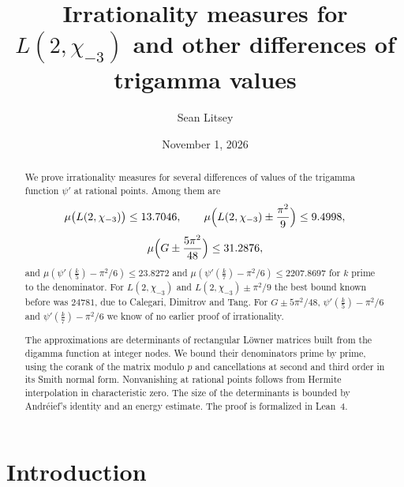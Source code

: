 \documentclass[11pt]{amsart}
\theoremstyle{definition}
\theoremstyle{remark}
\numberwithin{equation}{section}
\newcommand{\MuLamU}{31.2876}
\newcommand{\MuThirdsU}{9.4998}
\newcommand{\MuFifthsU}{23.8272}
\newcommand{\MuSeventhsU}{2207.8697}
\newcommand{\MuChi}{13.7046}
\begin{document}
\title[Irrationality measures for $L(2,\chi_{-3})$ and other trigamma differences]{Irrationality measures for
$L(2,\chi_{-3})$ and other differences of trigamma values}

\author{Sean Litsey}

\date{November 1, 2026}



\begin{abstract}
We prove irrationality measures for several differences of values of the trigamma function $\psi'$ at
rational points. Among them are
\[
 \mu\bigl(L(2,\chi_{-3})\bigr)\le\MuChi,\qquad
 \mu\Bigl(L(2,\chi_{-3})\pm\frac{\pi^2}9\Bigr)\le\MuThirdsU,
\]
\[
 \mu\Bigl(G\pm\frac{5\pi^2}{48}\Bigr)\le\MuLamU,
\]
and $\mu(\psi'(\frac k5)-\pi^2/6)\le\MuFifthsU$ and $\mu(\psi'(\frac k7)-\pi^2/6)\le\MuSeventhsU$
for $k$ prime to the denominator. For $L(2,\chi_{-3})$ and $L(2,\chi_{-3})\pm\pi^2/9$ the best bound known before
was $24781$, due to Calegari, Dimitrov and Tang. For $G\pm5\pi^2/48$, $\psi'(\frac k5)-\pi^2/6$ and
$\psi'(\frac k7)-\pi^2/6$ we know of no earlier proof of irrationality.

The approximations are determinants of rectangular L\"owner matrices built from the digamma function at
integer nodes. We bound their denominators prime by prime, using the corank of the matrix modulo $p$ and
cancellations at second and third order in its Smith normal form. Nonvanishing at rational points follows
from Hermite interpolation in characteristic zero. The size of the determinants is bounded by
Andr\'eief's identity and an energy estimate. The proof is formalized in Lean~4.
\end{abstract}

\maketitle
\tableofcontents

\section{Introduction}\label{sec:intro}
\end{document}
